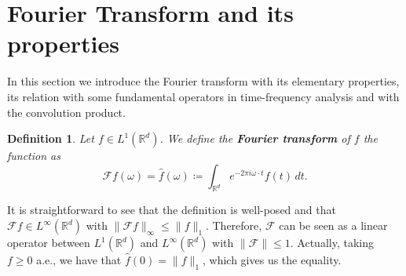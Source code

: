 \documentclass[corpo=11pt, stile=classica, tipotesi=custom,
greek, evenboxes, english]{toptesi}
\numberwithin{equation}{chapter}
\newtheorem{defi}[teo]{Definition}
\theoremstyle{definition}
\theoremstyle{remark}
\newcommand{\R}{\mathbb{R}} %
\newcommand{\F}{\mathscr{F}} %
\begin{document}
\section{Fourier Transform and its properties}\label{Fourier transform and its properties section}
In this section we introduce the Fourier transform with its elementary properties, its relation with some fundamental operators in time-frequency analysis and with the convolution product.
\begin{defi}\label{Fourier transform def}
	Let $f \in L^1(\R^d)$. We define the \textbf{Fourier transform} of $f$ the function as
	\begin{equation}\label{Fourier transform formula}
		\F f(\omega) = \hat{f}(\omega) \coloneqq \int_{\R^d} e^{-2 \pi i \omega \cdot t} f(t) \,dt.
	\end{equation}
\end{defi}
It is straightforward to see that the definition is well-posed and that $\F f \in L^{\infty}(\R^d)$ with $\|\F f\|_{\infty} \leq \| f \|_1$. Therefore, $\F$ can be seen as a linear operator between $L^1(\R^d)$ and $L^{\infty}(\R^d)$ with $\| \F \| \leq 1$. Actually, taking $f \geq 0$ a.e.,  we have that $\hat{f}(0) = \| f \|_1$, which gives us the equality.
\end{document}
